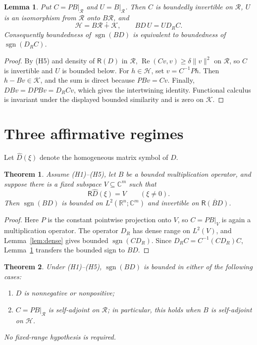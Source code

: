 \documentclass[11pt]{article}
\newtheorem{theorem}{Theorem}
\newtheorem{lemma}{Lemma}
\newcommand{\Hh}{\mathcal H}
\newcommand{\Rr}{\mathcal R}
\newcommand{\Kk}{\mathcal K}
\newcommand{\Ran}{\mathsf R}
\newcommand{\sgn}{\operatorname{sgn}}
\begin{document}
\begin{lemma}\label{lem:reduction}
Put $C=P B|_{\Rr}$ and $U=B|_{\Rr}$. Then $C$ is boundedly invertible on
$\Rr$, $U$ is an isomorphism from $\Rr$ onto $B\Rr$, and
\[
 \Hh=B\Rr\dotplus\Kk,\qquad BD\,U=U D_R C.
\]
Consequently boundedness of $\sgn(BD)$ is equivalent to boundedness of
$\sgn(D_R C)$.
\end{lemma}

\begin{proof}
By (H5) and density of $\Ran(D)$ in $\Rr$,
$\operatorname{Re}(Cv,v)\geq\delta\|v\|^2$ on $\Rr$, so $C$ is invertible
and $U$ is bounded below. For $h\in\Hh$, set $v=C^{-1}Ph$. Then
$h-Bv\in\Kk$, and the sum is direct because $PBv=Cv$. Finally,
$DBv=DPBv=D_RCv$, which gives the intertwining identity. Functional calculus
is invariant under the displayed bounded similarity and is zero on $\Kk$.
\end{proof}

\section*{Three affirmative regimes}
Let $\widehat D(\xi)$ denote the homogeneous matrix symbol of $D$.

\begin{theorem}\label{thm:fixed}
Assume (H1)--(H5), let $B$ be a bounded multiplication operator, and suppose
there is a fixed subspace $V\subseteq\mathbb C^m$ such that
\[
 \Ran\widehat D(\xi)=V \qquad(\xi\ne0).
\]
Then $\sgn(BD)$ is bounded on $L^2(\mathbb R^n;\mathbb C^m)$ and invertible
on $\overline{\Ran(BD)}$.
\end{theorem}

\begin{proof}
Here $P$ is the constant pointwise projection onto $V$, so
$C=P B|_V$ is again a multiplication operator. The operator $D_R$ has dense
range on $L^2(V)$, and Lemma~\ref{lem:dense} gives bounded $\sgn(CD_R)$.
Since $D_RC=C^{-1}(CD_R)C$, Lemma~\ref{lem:reduction} transfers the bounded
sign to $BD$.
\end{proof}

\begin{theorem}\label{thm:two-more}
Under (H1)--(H5), $\sgn(BD)$ is bounded in either of the following cases:
\begin{enumerate}[label=(\roman*)]
\item $D$ is nonnegative or nonpositive;
\item $C=P B|_{\Rr}$ is self-adjoint on $\Rr$; in particular, this holds
when $B$ is self-adjoint on $\Hh$.
\end{enumerate}
No fixed-range hypothesis is required.
\end{theorem}
\end{document}
